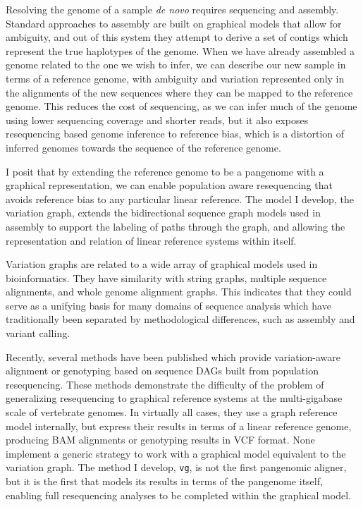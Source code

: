 Resolving the genome of a sample \emph{de novo} requires sequencing and assembly.
Standard approaches to assembly are built on graphical models that allow for ambiguity, and out of this system they attempt to derive a set of contigs which represent the true haplotypes of the genome.
When we have already assembled a genome related to the one we wish to infer, we can describe our new sample in terms of a reference genome, with ambiguity and variation represented only in the alignments of the new sequences where they can be mapped to the reference genome.
This reduces the cost of sequencing, as we can infer much of the genome using lower sequencing coverage and shorter reads, but it also exposes resequencing based genome inference to reference bias, which is a distortion of inferred genomes towards the sequence of the reference genome.

I posit that by extending the reference genome to be a pangenome with a graphical representation, we can enable population aware resequencing that avoids reference bias to any particular linear reference.
The model I develop, the variation graph, extends the bidirectional sequence graph models used in assembly to support the labeling of paths through the graph, and allowing the representation and relation of linear reference systems within itself.

Variation graphs are related to a wide array of graphical models used in bioinformatics.
They have similarity with string graphs, multiple sequence alignments, and whole genome alignment graphs.
This indicates that they could serve as a unifying basis for many domains of sequence analysis which have traditionally been separated by methodological differences, such as assembly and variant calling.

Recently, several methods have been published which provide variation-aware alignment or genotyping based on sequence DAGs built from population resequencing.
These methods demonstrate the difficulty of the problem of generalizing resequencing to graphical reference systems at the multi-gigabase scale of vertebrate genomes.
In virtually all cases, they use a graph reference model internally, but express their results in terms of a linear reference genome, producing BAM alignments or genotyping results in VCF format.
None implement a generic strategy to work with a graphical model equivalent to the variation graph.
The method I develop, {\tt vg}, is not the first pangenomic aligner, but it is the first that models its results in terms of the pangenome itself, enabling full resequencing analyses to be completed within the graphical model.

